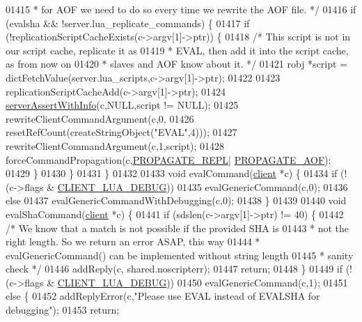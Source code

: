 \begin{DoxyCode}
{{{{{{{{{{{{01415 \textcolor{comment}{     * for AOF we need to do so every time we rewrite the AOF file. */}
01416     \textcolor{keywordflow}{if} (evalsha && !server.lua\_replicate\_commands) \{
01417         \textcolor{keywordflow}{if} (!replicationScriptCacheExists(c->argv[1]->ptr)) \{
01418             \textcolor{comment}{/* This script is not in our script cache, replicate it as}
01419 \textcolor{comment}{             * EVAL, then add it into the script cache, as from now on}
01420 \textcolor{comment}{             * slaves and AOF know about it. */}
01421             robj *script = dictFetchValue(server.lua\_scripts,c->argv[1]->ptr);
01422 
01423             replicationScriptCacheAdd(c->argv[1]->ptr);
01424             \hyperlink{server_8h_a7308f76cbff9a8d3797fe78190b91282}{serverAssertWithInfo}(c,NULL,script != NULL);
01425             rewriteClientCommandArgument(c,0,
01426                 resetRefCount(createStringObject(\textcolor{stringliteral}{"EVAL"},4)));
01427             rewriteClientCommandArgument(c,1,script);
01428             forceCommandPropagation(c,\hyperlink{server_8h_a59c6e025b4ed85642a0472fc3e73e298}{PROPAGATE\_REPL}|
      \hyperlink{server_8h_a542fb79924ca427c866fd63632f60777}{PROPAGATE\_AOF});
01429         \}
01430     \}
01431 \}
01432 
01433 \textcolor{keywordtype}{void} evalCommand(\hyperlink{structclient}{client} *c) \{
01434     \textcolor{keywordflow}{if} (!(c->flags & \hyperlink{server_8h_a59ed6554c95f9d07bf88bd62574f5946}{CLIENT\_LUA\_DEBUG}))
01435         evalGenericCommand(c,0);
01436     \textcolor{keywordflow}{else}
01437         evalGenericCommandWithDebugging(c,0);
01438 \}
01439 
01440 \textcolor{keywordtype}{void} evalShaCommand(\hyperlink{structclient}{client} *c) \{
01441     \textcolor{keywordflow}{if} (sdslen(c->argv[1]->ptr) != 40) \{
01442         \textcolor{comment}{/* We know that a match is not possible if the provided SHA is}
01443 \textcolor{comment}{         * not the right length. So we return an error ASAP, this way}
01444 \textcolor{comment}{         * evalGenericCommand() can be implemented without string length}
01445 \textcolor{comment}{         * sanity check */}
01446         addReply(c, shared.noscripterr);
01447         \textcolor{keywordflow}{return};
01448     \}
01449     \textcolor{keywordflow}{if} (!(c->flags & \hyperlink{server_8h_a59ed6554c95f9d07bf88bd62574f5946}{CLIENT\_LUA\_DEBUG}))
01450         evalGenericCommand(c,1);
01451     \textcolor{keywordflow}{else} \{
01452         addReplyError(c,\textcolor{stringliteral}{"Please use EVAL instead of EVALSHA for debugging"});
01453         \textcolor{keywordflow}{return};
}}}}}}}}}}}}
\end{DoxyCode}
